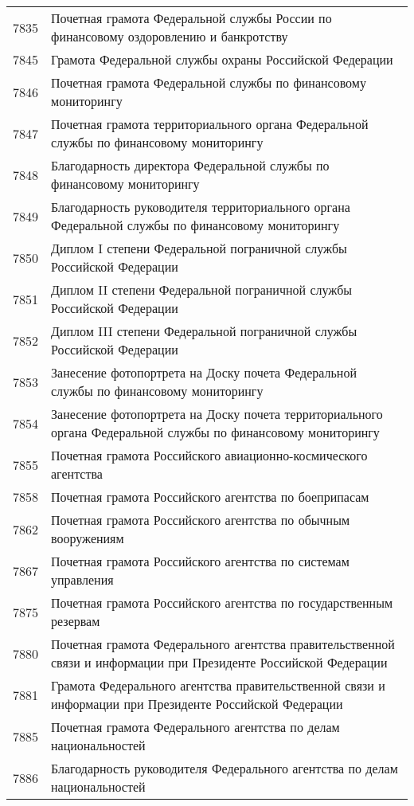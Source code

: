 \documentclass[10pt, a4paper, titlepage]{article}
\begin{document}
\begin{center}
\begin{longtable}{rp{}}
        7835 & Почетная грамота Федеральной службы России по финансовому оздоровлению и банкротству \\
        7845 & Грамота Федеральной службы охраны Российской Федерации \\
        7846 & Почетная грамота Федеральной службы по финансовому мониторингу \\
        7847 & Почетная грамота территориального органа Федеральной службы по финансовому мониторингу \\
        7848 & Благодарность директора Федеральной службы по финансовому мониторингу \\
        7849 & Благодарность руководителя территориального органа Федеральной службы по финансовому мониторингу \\
        7850 & Диплом I степени Федеральной пограничной службы Российской Федерации \\
        7851 & Диплом II степени Федеральной пограничной службы Российской Федерации \\
        7852 & Диплом III степени Федеральной пограничной службы Российской Федерации \\
        7853 & Занесение фотопортрета на Доску почета Федеральной службы по финансовому мониторингу \\
        7854 & Занесение фотопортрета на Доску почета территориального органа Федеральной службы по финансовому мониторингу \\
        7855 & Почетная грамота Российского авиационно-космического агентства \\
        7858 & Почетная грамота Российского агентства по боеприпасам \\
        7862 & Почетная грамота Российского агентства по обычным вооружениям \\
        7867 & Почетная грамота Российского агентства по системам управления \\
        7875 & Почетная грамота Российского агентства по государственным резервам \\
        7880 & Почетная грамота Федерального агентства правительственной связи и информации при Президенте Российской Федерации \\
        7881 & Грамота Федерального агентства правительственной связи и информации при Президенте Российской Федерации \\
        7885 & Почетная грамота Федерального агентства по делам национальностей \\
        7886 & Благодарность руководителя Федерального агентства по делам национальностей \\

\end{longtable}
\end{center}
\end{document}
